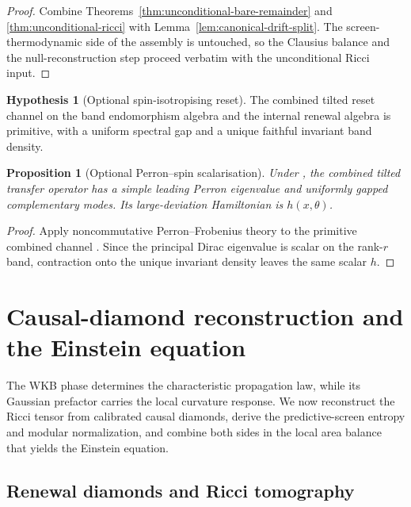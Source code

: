 \documentclass[11pt]{article}
\newtheorem{proposition}[theorem]{Proposition}
\theoremstyle{definition}
\newtheorem{hypothesis}[theorem]{Hypothesis}
\theoremstyle{remark}
\begin{document}
\begin{proof}
Combine Theorems~\ref{thm:unconditional-bare-remainder} and \ref{thm:unconditional-ricci} with
Lemma~\ref{lem:canonical-drift-split}.  The screen-thermodynamic side of the assembly is untouched,
so the Clausius balance and the null-reconstruction step proceed verbatim with the
unconditional Ricci input.
\end{proof}

\begin{hypothesis}[Optional spin-isotropising reset]
\label{hyp:spin-iso}
The combined tilted reset channel on the band endomorphism algebra and the
internal renewal algebra is primitive, with a uniform spectral gap and a unique
faithful invariant band density.
\end{hypothesis}

\begin{proposition}[Optional Perron--spin scalarisation]
\label{thm:perron-spin}
Under , the combined tilted transfer operator has a simple
leading Perron eigenvalue and uniformly gapped complementary modes.  Its
large-deviation Hamiltonian is $h(x,\theta)$.
\end{proposition}

\begin{proof}
Apply noncommutative Perron--Frobenius theory to the primitive combined channel
\cite{EvansHoeghKrohn,Schrader}.  Since the principal Dirac eigenvalue is scalar
on the rank-$r$ band, contraction onto the unique invariant density leaves the
same scalar $h$.
\end{proof}

\section{Causal-diamond reconstruction and the Einstein equation}
\label{sec:einstein-reconstruction}

The WKB phase determines the characteristic propagation law, while its Gaussian
prefactor carries the local curvature response.  We now reconstruct the Ricci
tensor from calibrated causal diamonds, derive the predictive-screen entropy
and modular normalization, and combine both sides in the local area balance
that yields the Einstein equation.

\subsection{Renewal diamonds and Ricci tomography}
\end{document}
